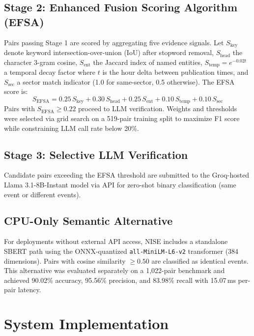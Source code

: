 \documentclass[conference]{IEEEtran}
\begin{document}
\subsection{Stage 2: Enhanced Fusion Scoring Algorithm (EFSA)}
Pairs passing Stage 1 are scored by aggregating five evidence signals.
Let $S_{\text{key}}$ denote keyword intersection-over-union (IoU) after stopword removal, $S_{\text{head}}$ the character 3-gram cosine, $S_{\text{ent}}$ the Jaccard index of named entities, $S_{\text{temp}} = e^{-0.02t}$ a temporal decay factor where $t$ is the hour delta between publication times, and $S_{\text{sec}}$ a sector match indicator (1.0 for same-sector, 0.5 otherwise).
The EFSA score is:
\begin{equation}
S_{\text{EFSA}} = 0.25\,S_{\text{key}} + 0.30\,S_{\text{head}} + 0.25\,S_{\text{ent}} + 0.10\,S_{\text{temp}} + 0.10\,S_{\text{sec}}
\end{equation}
Pairs with $S_{\text{EFSA}} \ge 0.22$ proceed to LLM verification.
Weights and thresholds were selected via grid search on a 519-pair training split to maximize F1 score while constraining LLM call rate below 20\%.

\subsection{Stage 3: Selective LLM Verification}
Candidate pairs exceeding the EFSA threshold are submitted to the Groq-hosted Llama 3.1-8B-Instant model via API for zero-shot binary classification (same event or different events).

\subsection{CPU-Only Semantic Alternative}
For deployments without external API access, NISE includes a standalone SBERT path using the ONNX-quantized \texttt{all-MiniLM-L6-v2} transformer (384 dimensions).
Pairs with cosine similarity $\ge 0.50$ are classified as identical events.
This alternative was evaluated separately on a 1,022-pair benchmark and achieved 90.02\% accuracy, 95.56\% precision, and 83.98\% recall with 15.07\,ms per-pair latency.

\section{System Implementation}
\end{document}
